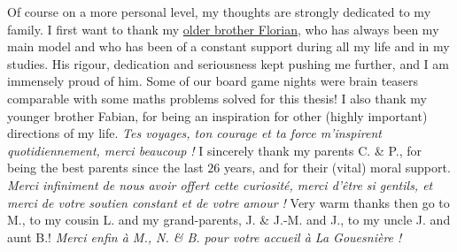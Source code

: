 \begin{acknowledgements}
Of course on a more personal level, my thoughts are strongly dedicated to my family.
%
I first want to thank my \href{https://paris-sorbonne.academia.edu/FBesson}{older brother Florian}, who has always been my main model and who has been of a constant support during all my life and in my studies.
His rigour, dedication and seriousness kept pushing me further, and I am immensely proud of him.
Some of our board game nights were brain teasers comparable with some maths problems solved for this thesis!
%
I also thank my younger brother Fabian, for being an inspiration for other (highly important) directions of my life. \emph{Tes voyages, ton courage et ta force m'inspirent quotidiennement, merci beaucoup !}
I sincerely thank my parents C. \& P., for being the best parents since the last $26$ years, and for their (vital) moral support.
\emph{Merci infiniment de nous avoir offert cette curiosité, merci d'être si gentils, et merci de votre soutien constant et de votre amour !}
Very warm thanks then go to M., to my cousin L. and my grand-parents, J. \& J.-M. and J., to my uncle J. and aunt B.!
\emph{Merci enfin à M., N. \& B. pour votre accueil à La Gouesnière !}


\end{acknowledgements}
